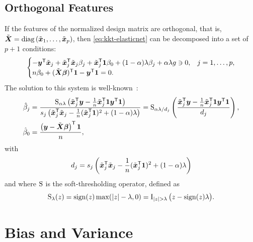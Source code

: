 \subsection{Orthogonal Features}

If the features of the normalized design matrix are orthogonal, that is, \(\tilde{\boldsymbol{X}} = \operatorname{diag}\left(\tilde{\boldsymbol{x}}_1, \dots, \tilde{\boldsymbol{x}}_p\right) \), then \eqref{eq:kkt-elasticnet} can be decomposed into a set of \(p + 1\) conditions:
\[
  \begin{cases}
    -\boldsymbol{y}^{\mathsf{T}} \tilde{\boldsymbol{x}}_j + \tilde{\boldsymbol{x}}_j^{\mathsf{T}} \tilde{\boldsymbol{x}}_j \beta_j + \tilde{\boldsymbol{x}}_j^{\mathsf{T}} \boldsymbol{1} \beta_0 + (1 - \alpha) \lambda \beta_j + \alpha \lambda g \ni 0, & j=1,\dots,p, \\
    n \beta_0 + (\tilde{\boldsymbol{X}}\boldsymbol{\beta})^{\mathsf{T}} \boldsymbol{1} -  \boldsymbol{y}^{\mathsf{T}} \boldsymbol{1} = 0.
  \end{cases}
\]
The solution to this system is well-known~\parencite{donoho1994}:
\begin{align}
  \label{eq:orthogonal-solution}
  \hat\beta_j & = \frac{\operatorname{S}_{\alpha\lambda}\left(\tilde{\boldsymbol{x}}_j^{\mathsf{T}} \boldsymbol{y} - \frac{1}{n} \tilde{\boldsymbol{x}}_j^{\mathsf{T}} \boldsymbol{1} \boldsymbol{y}^{\mathsf{T}} \boldsymbol{1}\right)}{s_j\left(\tilde{\boldsymbol{x}}_j^{\mathsf{T}} \tilde{\boldsymbol{x}}_j - \frac{1}{n}(\tilde{\boldsymbol{x}}_j^{\mathsf{T}} \boldsymbol{1})^2 + (1 - \alpha) \lambda\right)} = \operatorname{S}_{\alpha\lambda/d_j}\left(\frac{\tilde{\boldsymbol{x}}_j^{\mathsf{T}} \boldsymbol{y} - \frac{1}{n} \tilde{\boldsymbol{x}}_j^{\mathsf{T}} \boldsymbol{1} \boldsymbol{y}^{\mathsf{T}} \boldsymbol{1}}{d_j}\right), \\
  \hat\beta_0 & = \frac{\left(\boldsymbol{y} - \tilde{\boldsymbol{X}}\boldsymbol{\beta}\right)^{\mathsf{T}} \boldsymbol{1}}{n},
\end{align}
with
\[
  d_j = s_j\left(\tilde{\boldsymbol{x}}_j^{\mathsf{T}} \tilde{\boldsymbol{x}}_j - \frac{1}{n}(\tilde{\boldsymbol{x}}_j^{\mathsf{T}} \boldsymbol{1})^2 + (1 - \alpha)\lambda\right)
\]
and where \(\operatorname{S}\) is the soft-thresholding operator, defined as
\[
  \st_\lambda(z) = \sign(z) \max(|z| - \lambda, 0) = \ind{|z|>\lambda}\big(z - \sign(z)\lambda\big).
\]

\section{Bias and Variance}

